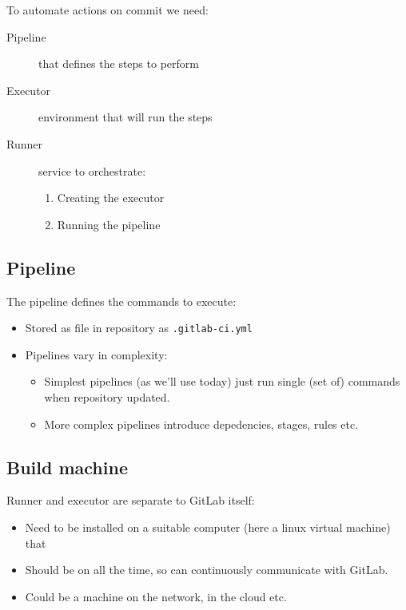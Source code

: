 \documentclass[slides]{pgnotes}
\begin{document}
To automate actions on commit we need:

\begin{description}
\item[Pipeline] that defines the steps to perform
\item[Executor] environment that will run the steps
\item[Runner] service to orchestrate:
  \begin{enumerate}
  \item Creating the executor
  \item Running the pipeline
  \end{enumerate}
\end{description}



\subsection{Pipeline}

The pipeline defines the commands to execute:
\begin{itemize}
\item Stored as file in repository as \texttt{.gitlab-ci.yml}
\item Pipelines vary in complexity:
  \begin{itemize}
  \item Simplest pipelines (as we'll use today) just run single (set of) commands when repository updated.
  \item More complex pipelines introduce depedencies, stages, rules etc.
  \end{itemize}
\end{itemize}



\subsection{Build machine}

Runner and executor are separate to GitLab itself:
\begin{itemize}
\item Need to be installed on a suitable computer (here a linux virtual machine) that
\item Should be on all the time, so can continuously communicate with GitLab.
\item Could be a machine on the network, in the cloud etc.
\end{itemize}
\end{document}
